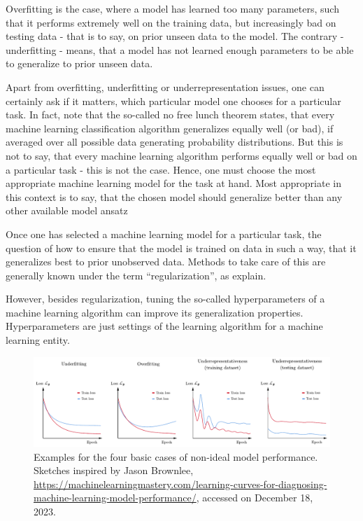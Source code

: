 \documentclass[a4paper,11pt]{report}
\def\fc#1{{\color{black}{#1}}} %
\def\lk#1{{\color{black}{#1}}}
\begin{document}
Overfitting is the case, where a model has learned too many parameters, such that it performs extremely well on the training data, but increasingly bad on testing data - that is to say, on prior unseen data to the model. The contrary - underfitting - means, that a model has not learned enough parameters to be able to generalize to prior unseen data.

Apart from overfitting, underfitting or underrepresentation issues, one can certainly ask if it matters, which particular model \lk{ansatz} one chooses for a particular task. In fact, \cite[p.116]{Goodfellow.2016} note that the so-called no free lunch theorem states, that every machine learning classification algorithm generalizes equally well (or bad), if averaged over all possible data generating probability distributions. But this is not to say, that every machine learning algorithm performs equally well or bad on a particular task - this is not the case. Hence, one must choose the most appropriate machine learning model for the task at hand. Most appropriate in this context is to say, that the chosen model should generalize better than any other available model ansatz \lk{for the chosen task.}

Once one has selected a machine learning model for a particular task, the question \lk{arises} of how to ensure that the model is trained on data in such a way, that it generalizes best to prior unobserved data. Methods to take care of this are generally known under the term ``regularization'', as \cite[p.120]{Goodfellow.2016} explain.

However, besides regularization, tuning the so-called hyperparameters of a machine learning algorithm can improve its generalization properties. Hyperparameters are just settings of the learning algorithm for a machine learning entity. \lk{In order to find optimal hyperparameters, either so-called grid search algorithms can be applied; or one can just inspect the learning curves for different settings of hyperparameters.} \fc{In the ideal case, both procedures are carried out, since the learning curves themselves do not provide enough information as to determine, which hyperparameters are optimal for a certain model.}
\begin{figure}[h]
\centering
\includegraphics[width=\textwidth]{figures/learningcurves.pdf}
\cprotect\caption{Examples for the four basic cases of non-ideal model performance. Sketches inspired by Jason Brownlee, \url{https://machinelearningmastery.com/learning-curves-for-diagnosing-machine-learning-model-performance/}, accessed on December 18, 2023.}
\label{fig:learningcurves}
\end{figure}
\end{document}
